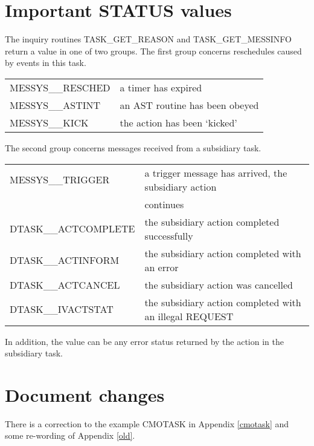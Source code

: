 \documentclass[twoside,11pt,nolof]{starlink}
\begin{document}
\section{Important STATUS values}

The inquiry routines
TASK\_GET\_REASON and TASK\_GET\_MESSINFO return a value in one of two groups.
The first group concerns reschedules caused by events in this task.

\begin{center}
\begin{tabular}{ll}
MESSYS\_\_RESCHED  & a timer has expired \\
MESSYS\_\_ASTINT   & an AST routine has been obeyed \\
MESSYS\_\_KICK     & the action has been `kicked' \\
\end{tabular}
\end{center}

The second group concerns messages received from a subsidiary task.

\begin{center}
\begin{tabular}{ll}
MESSYS\_\_TRIGGER    &  a trigger message has arrived, the subsidiary action \\
                     &  continues \\
DTASK\_\_ACTCOMPLETE &  the subsidiary action completed successfully \\
DTASK\_\_ACTINFORM   &  the subsidiary action completed with an error \\
DTASK\_\_ACTCANCEL   &  the subsidiary action was cancelled \\
DTASK\_\_IVACTSTAT   &  the subsidiary action completed with an illegal
REQUEST \\
\end{tabular}
\end{center}

In addition, the value can be any error status returned by the action
in the subsidiary task.

\section{Document changes}

There is a correction to the example CMOTASK in Appendix \ref{cmotask} and some
re-wording of Appendix \ref{old}.
\end{document}
